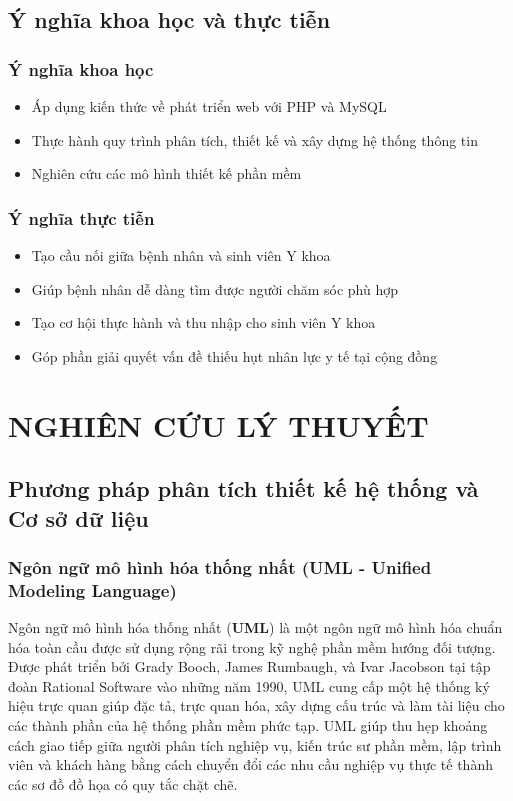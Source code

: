 \documentclass[a4paper,12pt]{report}
\begin{document}
\section{Ý nghĩa khoa học và thực tiễn}

\subsection{Ý nghĩa khoa học}
\begin{itemize}
    \item Áp dụng kiến thức về phát triển web với PHP và MySQL
    \item Thực hành quy trình phân tích, thiết kế và xây dựng hệ thống thông tin
    \item Nghiên cứu các mô hình thiết kế phần mềm
\end{itemize}

\subsection{Ý nghĩa thực tiễn}
\begin{itemize}
    \item Tạo cầu nối giữa bệnh nhân và sinh viên Y khoa
    \item Giúp bệnh nhân dễ dàng tìm được người chăm sóc phù hợp
    \item Tạo cơ hội thực hành và thu nhập cho sinh viên Y khoa
    \item Góp phần giải quyết vấn đề thiếu hụt nhân lực y tế tại cộng đồng
\end{itemize}


\chapter{NGHIÊN CỨU LÝ THUYẾT}

\section{Phương pháp phân tích thiết kế hệ thống và Cơ sở dữ liệu}

\subsection{Ngôn ngữ mô hình hóa thống nhất (UML - Unified Modeling Language)}
Ngôn ngữ mô hình hóa thống nhất (\textbf{UML}) là một ngôn ngữ mô hình hóa chuẩn hóa toàn cầu được sử dụng rộng rãi trong kỹ nghệ phần mềm hướng đối tượng. Được phát triển bởi Grady Booch, James Rumbaugh, và Ivar Jacobson tại tập đoàn Rational Software vào những năm 1990, UML cung cấp một hệ thống ký hiệu trực quan giúp đặc tả, trực quan hóa, xây dựng cấu trúc và làm tài liệu cho các thành phần của hệ thống phần mềm phức tạp. UML giúp thu hẹp khoảng cách giao tiếp giữa người phân tích nghiệp vụ, kiến trúc sư phần mềm, lập trình viên và khách hàng bằng cách chuyển đổi các nhu cầu nghiệp vụ thực tế thành các sơ đồ đồ họa có quy tắc chặt chẽ.
\end{document}
